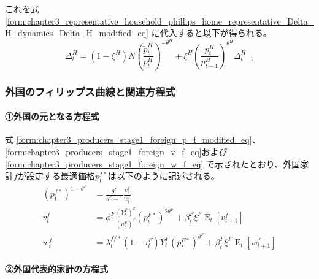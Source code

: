 これを式
\eqref{form:chapter3_representative_household_phillips_home_representative_Delta_H_dynamics_Delta_H_modified_eq}
に代入すると以下が得られる。
\begin{equation}
\label{form:chapter3_representative_household_phillips_home_representative_Delta_H_dynamics_Delta_H_modified2_eq}
    \Delta_t^H
    =(1-\xi^H)N\left(\frac{\widetilde{p}_t^H}{p_t^H}\right)^{-\theta^H}+\xi^H\left(\frac{p_t^H}{p_{t-1}^H}\right)^{\theta^H}\Delta_{t-1}^H
\end{equation}

\subsubsection{外国のフィリップス曲線と関連方程式}
\label{sec:chapter3_representative_household_phillips_foreign}

\paragraph{①外国の元となる方程式}
\label{sec:chapter3_representative_household_phillips_foreign_original}
式
\eqref{form:chapter3_producers_stage1_foreign_p_f_modified_eq}、
\eqref{form:chapter3_producers_stage1_foreign_v_f_eq}および
\eqref{form:chapter3_producers_stage1_foreign_w_f_eq}
で示されたとおり、外国家計\(f\)が設定する最適価格\(p_t^{f*}\)は以下のように記述される。
\begin{align}
    \label{form:chapter3_representative_household_phillips_foreign_original_p_f_eq}
        (p_t^{f*})^{1+\theta^F}&=\frac{\theta^F}{\theta^F-1}\frac{v_t^f}{w_t^f} \\
    \label{form:chapter3_representative_household_phillips_foreign_original_v_f_eq}
        v_t^f&=\phi^F\frac{(Y_t^F)^2}{(a_t^F)^2}(p_t^{F*})^{2\theta^F}+\beta_t^F\xi^F\operatorname{E}_t[v_{t+1}^f] \\
    \label{form:chapter3_representative_household_phillips_foreign_original_w_f_eq}
        w_t^f&=\lambda_t^{f/*}(1-\tau_t^F)Y_t^F(p_t^{F*})^{\theta^F}+\beta_t^F\xi^F\operatorname{E}_t[w_{t+1}^f]
\end{align}

\paragraph{②外国代表的家計の方程式}
\label{sec:chapter3_representative_household_phillips_foreign_representative}

